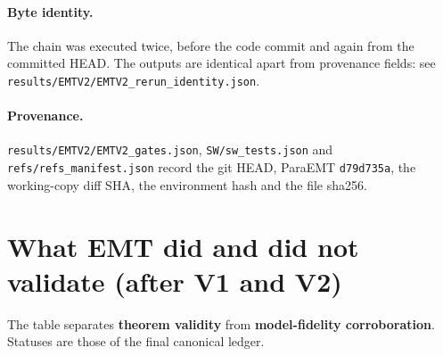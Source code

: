 \documentclass[10pt,a4paper]{article}
\newcommand{\f}[1]{\nolinkurl{#1}}
\begin{document}
\paragraph{Byte identity.} The chain was executed twice, before the code commit
and again from the committed HEAD. The outputs are identical apart from
provenance fields: see \f{results/EMTV2/EMTV2_rerun_identity.json}.

\paragraph{Provenance.} \f{results/EMTV2/EMTV2_gates.json},
\f{SW/sw_tests.json} and \f{refs/refs_manifest.json} record the git HEAD,
ParaEMT \texttt{d79d735a}, the working-copy diff SHA, the environment hash and
the file sha256.

\section*{What EMT did and did not validate (after V1 and V2)}

The table separates \textbf{theorem validity} from \textbf{model-fidelity
corroboration}. Statuses are those of the final canonical ledger.
\end{document}
